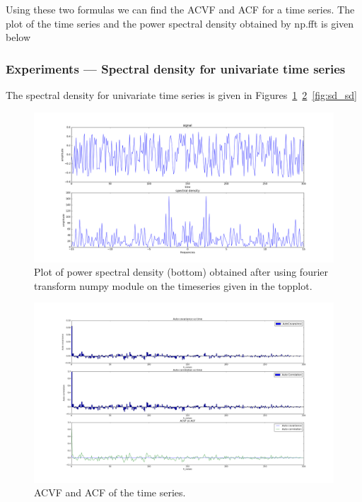 \documentclass{article}
\begin{document}
Using these two formulas we can find the ACVF and ACF for a time series.  The plot of the time series and the power spectral density obtained by np.fft is given below

\subsubsection{Experiments --- Spectral density for univariate time series}
The spectral density for univariate time series is given in Figures~\ref{fig:sd_psd}~\ref{fig:sd_acf_acvf}~\ref{fig:sd_sd}

\begin{figure}[ht!]
  \centering
  \includegraphics[width=1\textwidth]{images/spectral_density/psd}
  \caption{Plot of power spectral density (bottom) obtained after using fourier transform numpy module on the timeseries given in the topplot.\label{fig:sd_psd}}
\end{figure}

\begin{figure}[ht!]
  \centering
  \includegraphics[width=1\textwidth]{images/spectral_density/acf_acvf}
  \caption{ACVF and ACF of the time series.\label{fig:sd_acf_acvf}}
\end{figure}
\end{document}
